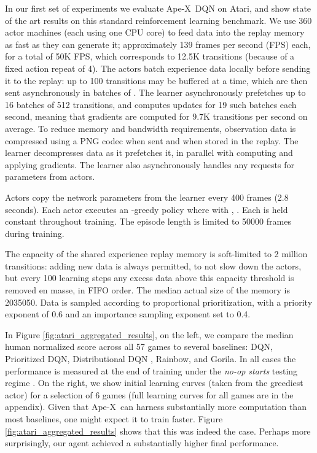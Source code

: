 \documentclass{article} \PassOptionsToPackage{usenames,dvipsnames}{xcolor}
\def\apex{Ape-X}
\begin{document}
\setlength\dashlinedash{1pt}
\setlength\dashlinegap{1.5pt}
\setlength\arrayrulewidth{0.3pt}

In our first set of experiments we evaluate \apex\ DQN on Atari, and show state of the art results on this standard reinforcement learning benchmark. We use 360 actor machines (each using one CPU core) to feed data into the replay memory as fast as they can generate it; approximately 139 frames per second (FPS) each, for a total of 50K FPS, which corresponds to 12.5K transitions (because of a fixed action repeat of 4). The actors batch experience data locally before sending it to the replay: up to 100 transitions may be buffered at a time, which are then sent asynchronously in batches of . The learner asynchronously prefetches up to 16 batches of 512 transitions, and computes updates for 19 such batches each second, meaning that gradients are computed for 9.7K transitions per second on average. To reduce memory and bandwidth requirements, observation data is compressed using a PNG codec when sent and when stored in the replay. The learner decompresses data as it prefetches it, in parallel with computing and applying gradients. The learner also asynchronously handles any requests for parameters from actors.

Actors copy the network parameters from the learner every 400 frames (2.8 seconds). Each actor  executes an -greedy policy where  with , . Each  is held constant throughout training. The episode length is limited to 50000 frames during training.

The capacity of the shared experience replay memory is soft-limited to 2 million transitions: adding new data is always permitted, to not slow down the actors, but every 100 learning steps any excess data above this capacity threshold is removed en masse, in FIFO order. The median actual size of the memory is 2035050. Data is sampled according to proportional prioritization, with a priority exponent of 0.6 and an importance sampling exponent set to 0.4.

In Figure \ref{fig:atari_aggregated_results}, on the left, we compare the median human normalized score across all 57 games to several baselines: DQN, Prioritized DQN, Distributional DQN \citep{distributional}, Rainbow, and Gorila. In all cases the performance is measured at the end of training under the \emph{no-op starts} testing regime \citep{dqn}. On the right, we show initial learning curves (taken from the greediest actor) for a selection of 6 games (full learning curves for all games are in the appendix). Given that \apex\ can harness substantially more computation than most baselines, one might expect it to train faster. Figure \ref{fig:atari_aggregated_results} shows that this was indeed the case. Perhaps more surprisingly, our agent achieved a substantially higher final performance.
\end{document}
